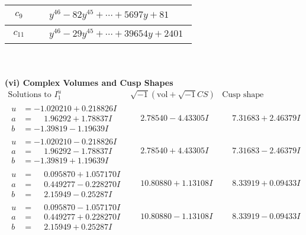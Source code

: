 \documentclass[1p]{elsarticle_modified}
\theoremstyle{definition}
\newcommand{\I}{\sqrt{-1}}
\begin{document}
\begin{tabular}{m{50pt}|m{274pt}}
\hline $$\begin{aligned}c_{9}\end{aligned}$$&$\begin{aligned}
&y^{46}-82 y^{45}+\cdots+5697 y+81
\end{aligned}$\\
\hline $$\begin{aligned}c_{11}\end{aligned}$$&$\begin{aligned}
&y^{46}-29 y^{45}+\cdots+39654 y+2401
\end{aligned}$\\
\hline
\end{tabular}\\~\\
\newpage\flushleft \textbf{(vi) Complex Volumes and Cusp Shapes}
$$\begin{array}{c|c|c}  
\text{Solutions to }I^u_{1}& \I (\text{vol} + \sqrt{-1}CS) & \text{Cusp shape}\\
 \hline 
\begin{aligned}
u &= -1.020210 + 0.218826 I \\
a &= \phantom{-}1.96292 + 1.78837 I \\
b &= -1.39819 - 1.19639 I\end{aligned}
 & \phantom{-}2.78540 - 4.43305 I & \phantom{-}7.31683 + 2.46379 I \\ \hline\begin{aligned}
u &= -1.020210 - 0.218826 I \\
a &= \phantom{-}1.96292 - 1.78837 I \\
b &= -1.39819 + 1.19639 I\end{aligned}
 & \phantom{-}2.78540 + 4.43305 I & \phantom{-}7.31683 - 2.46379 I \\ \hline\begin{aligned}
u &= \phantom{-}0.095870 + 1.057170 I \\
a &= \phantom{-}0.449277 - 0.228270 I \\
b &= \phantom{-}2.15949 - 0.25287 I\end{aligned}
 & \phantom{-}10.80880 + 1.13108 I & \phantom{-}8.33919 + 0.09433 I \\ \hline\begin{aligned}
u &= \phantom{-}0.095870 - 1.057170 I \\
a &= \phantom{-}0.449277 + 0.228270 I \\
b &= \phantom{-}2.15949 + 0.25287 I\end{aligned}
 & \phantom{-}10.80880 - 1.13108 I & \phantom{-}8.33919 - 0.09433 I \\ \hline\begin{aligned}

\end{aligned}
\end{array}$$
\end{document}
